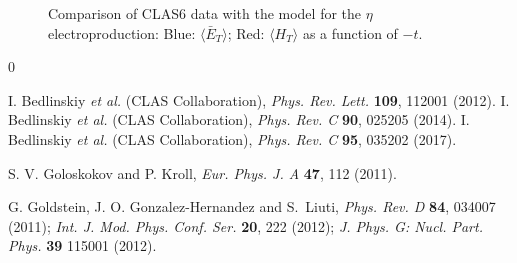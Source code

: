 \documentclass[prc,floatfix,superscriptaddress]{revtex4}
\newcommand{\GPDHT}{\langle H_T \rangle}
\newcommand{\GPDETbar}{\langle \bar{E}_T \rangle}
\begin{document}
\begin{figure}[t!]
{}
\label{eta_gff}
\vspace*{-70mm}
\caption{Comparison of CLAS6 data with the model for the $\eta$ electroproduction:
Blue: $\GPDETbar$;
Red: $\GPDHT$  as a function of $-t$.
}\label{fig:eta_gff}
\end{figure}



\begin{thebibliography} {0}

 I. Bedlinskiy {\it et al.} (CLAS Collaboration), \emph{ Phys. Rev. Lett. }{\bf 109}, 112001 (2012). 
 I. Bedlinskiy {\it et al.} (CLAS Collaboration), \emph{ Phys. Rev. C} {\bf 90}, 025205 (2014).
 I. Bedlinskiy {\it et al.} (CLAS Collaboration), \emph{ Phys. Rev. C} {\bf 95}, 035202 (2017).




 S. V. Goloskokov and P. Kroll, \emph{ Eur. Phys. J. A} {\bf47}, 112 (2011).

  G. Goldstein, J. O. Gonzalez-Hernandez  and S.~Liuti,%
\emph{ Phys. Rev. D }{\bf84}, 034007 (2011);
\emph{ Int. J. Mod. Phys. Conf. Ser. }{\bf20}, 222 (2012);
\emph{ J. Phys. G: Nucl. Part. Phys.} {\bf39} 115001 (2012).









\end{thebibliography}
\end{document}
